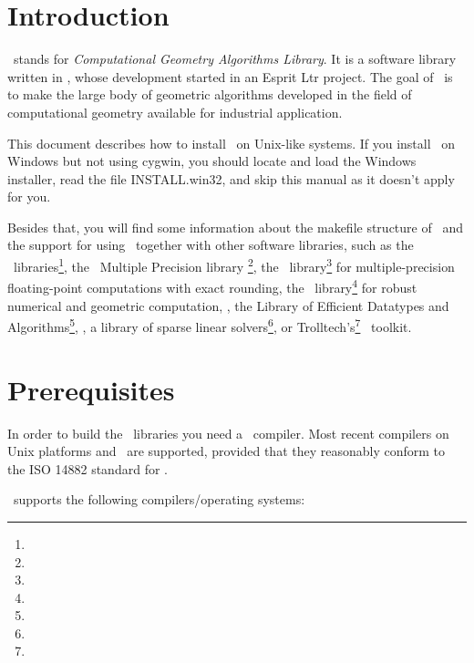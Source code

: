 \newcommand{\TTindex}[1]{\index{#1@{\tt #1}}}
\newcommand{\TTsubindex}[2]{\index{#1@{\tt #1}!{#2}}}
\newcommand{\TTsubindextwo}[2]{\index{#1!#2@{\tt #2} }}

\section{Introduction}

\cgal\ stands for \textit{Computational Geometry Algorithms Library}.
It is a software library written in \CC, whose development started in
an {\sc Esprit Ltr} project. The goal of \cgal\ is to make the large
body of geometric algorithms developed in the field of computational
geometry available for industrial application.

This document describes how to install \cgal\ on Unix-like systems.
If you install \cgal\ on Windows but not using cygwin, you should locate
and load the Windows installer, read the file INSTALL.win32, and skip
this manual as it doesn't apply for you.

Besides that, you will find some information about the makefile
structure of \cgal\ and the support for using \cgal\ together with
other software libraries, such as the \boost\
libraries\footnote{\boostpage}, the \gnu\ Multiple Precision library
\gmp\footnote{\gmppage}, the \mpfr\ library\footnote{\mpfrpage} for
multiple-precision floating-point computations with exact rounding,
the \core\ library\footnote{\corepage} for robust numerical and
geometric computation, \leda, the Library of Efficient Datatypes and
Algorithms\footnote{\ledapage}, \taucs, a library of sparse linear
solvers\footnote{\taucspage}, or Trolltech's\footnote{\trolltechpage}
\qt\ toolkit.

\section{Prerequisites\label{sec:prerequisites}}

In order to build the \cgal\ libraries you need a \CC\ compiler.  Most
recent compilers on Unix platforms and \mswin\ are supported, provided
that they reasonably conform to the ISO 14882 standard for \CC.

\cgaldir\ supports the following compilers/operating systems:

